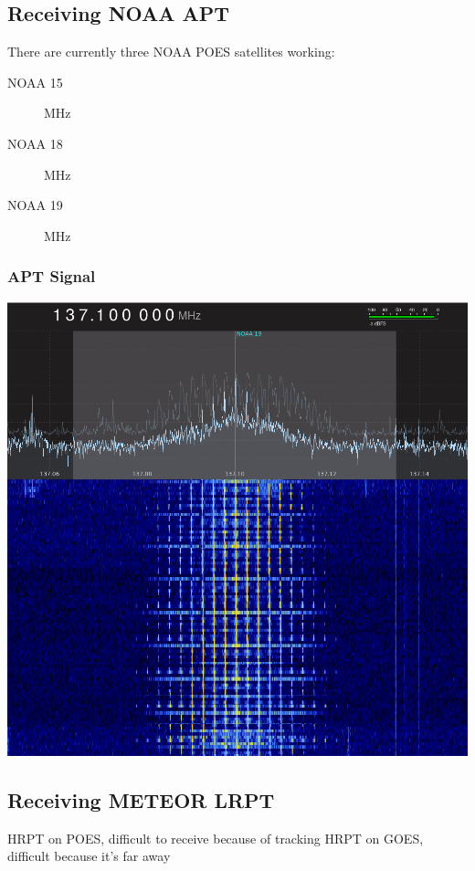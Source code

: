 \documentclass[]{beamer}
\begin{document}
\subsection{Receiving NOAA APT}
\begin{frame}
    There are currently three NOAA POES satellites working:
    \begin{description}
        \item[NOAA 15]  MHz
        \item[NOAA 18]  MHz
        \item[NOAA 19]  MHz
    \end{description}
\end{frame}
\begin{frame}
    \frametitle{APT Signal}
    \begin{center}
        \includegraphics[width=0.75\paperwidth,height=0.75\paperheight,keepaspectratio]{images/apt-gqrx.png}
    \end{center}
\end{frame}
\subsection{Receiving METEOR LRPT}
\begin{frame}
    HRPT on POES, difficult to receive because of tracking
    HRPT on GOES, difficult because it's far away
\end{frame}
\end{document}
